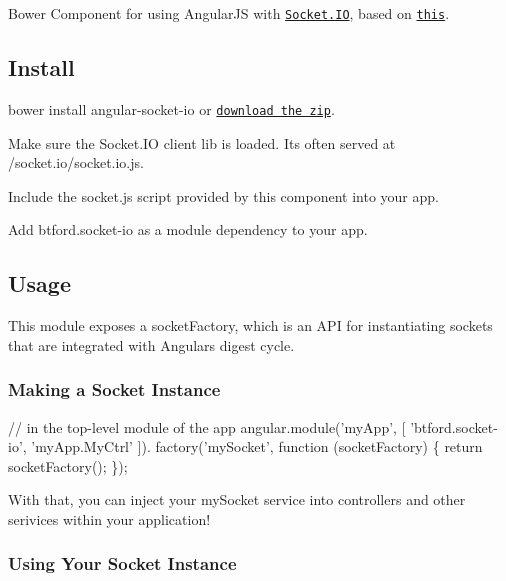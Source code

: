Bower Component for using Angular\+JS with \href{http://socket.io/}{\tt Socket.\+IO}, based on \href{http://briantford.com/blog/angular-socket-io.html}{\tt this}.

\subsection*{Install}


\begin{DoxyEnumerate}
\item {\ttfamily bower install angular-\/socket-\/io} or \href{https://github.com/btford/angular-socket-io/archive/master.zip}{\tt download the zip}.
\item Make sure the Socket.\+IO client lib is loaded. It\textquotesingle{}s often served at {\ttfamily /socket.io/socket.\+io.\+js}.
\item Include the {\ttfamily socket.\+js} script provided by this component into your app.
\item Add {\ttfamily btford.\+socket-\/io} as a module dependency to your app.
\end{DoxyEnumerate}

\subsection*{Usage}

This module exposes a {\ttfamily socket\+Factory}, which is an A\+PI for instantiating sockets that are integrated with Angular\textquotesingle{}s digest cycle.

\subsubsection*{Making a Socket Instance}


\begin{DoxyCode}
// in the top-level module of the app
angular.module('myApp', [
  'btford.socket-io',
  'myApp.MyCtrl'
]).
factory('mySocket', function (socketFactory) \{
  return socketFactory();
\});
\end{DoxyCode}


With that, you can inject your {\ttfamily my\+Socket} service into controllers and other serivices within your application!

\subsubsection*{Using Your Socket Instance}

